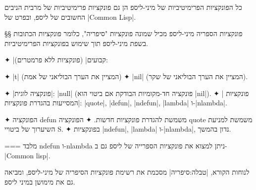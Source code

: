 כל הפונקציות הפרימיטיביות של מיני-ליספ הן גם פונקציות פרימיטיביות של מרבית
הניבים החשובים של ליספ, ובפרט של \E|Common Lisp|.

§§ פונקציות הספריה
מיני-ליספ מכיל שמונה פונקציות "סיפריה", כלומר פונקציות הכתובות בשפת
מיני-ליספ תוך שימוש בפונקציות הפרימיטיביות.

✦ \ע|קבועים| (פונקציות ללא פרמטרים):
\begin{itemize}
  ✦ \E|t| (המציין את הערך הבוליאני של אמת)
  ✦ \E|nil| (המציין את הערך הבוליאני של שקר).
\end{itemize}
✦ \ע|פונקציה לוגית|: \E|null| (פונקציה חד-מקומיות הבודקת אם ביטוי הוא \E|nil|).
✦ \ע| פונקציות המסייעות בהגדרת פונקציות|:
\E|quote|, \E|defun|, \E|ndefun|, \E|lambda| ו-\E|nlambda|.
\begin{itemize}
    ✦ הפונקציה defun משמשת להגדרת פונקציות חדשות.
    ✦ הפונקציה quote משמשת למניעת השיערוך של ביטויי S.
✦ בפונקציות \E|ndefun|, \E|lambda| ו-\E|nlambda|, נדון בהמשך.
\end{itemize}
===
מלבד ndefun ו-nlambda ניתן למצוא את פונקציות הספרייה
של ליספ גם ב-\E|Common lisp|.

לנוחות הקורא, |טבלה:סיפריה| מסכמת את רשימת פונקציות הסיפריה של מיני-ליספ,
ומביאה גם את מימושן במיני ליספ.

